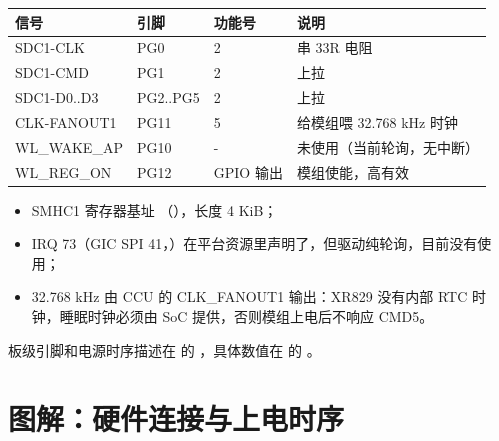 \begin{table}[H]
\centering
\begin{tabular}{lllp{5.6cm}}
\toprule
信号 & 引脚 & 功能号 & 说明 \\
\midrule
SDC1-CLK & PG0 & 2 & 串 33R 电阻 \\
SDC1-CMD & PG1 & 2 & 上拉 \\
SDC1-D0..D3 & PG2..PG5 & 2 & 上拉 \\
CLK-FANOUT1 & PG11 & 5 & 给模组喂 32.768 kHz 时钟 \\
WL\_WAKE\_AP & PG10 & - & 未使用（当前轮询，无中断） \\
WL\_REG\_ON & PG12 & GPIO 输出 & 模组使能，高有效 \\
\bottomrule
\end{tabular}
\end{table}

\begin{itemize}
  \item SMHC1 寄存器基址 （），长度 4 KiB；
  \item IRQ 73（GIC SPI 41，）在平台资源里声明了，但驱动纯轮询，目前没有使用；
  \item 32.768 kHz 由 CCU 的 CLK\_FANOUT1 输出：XR829 没有内部 RTC 时钟，睡眠时钟必须由 SoC 提供，否则模组上电后不响应 CMD5。
\end{itemize}

板级引脚和电源时序描述在  的 ，具体数值在  的 。

\section{图解：硬件连接与上电时序}

